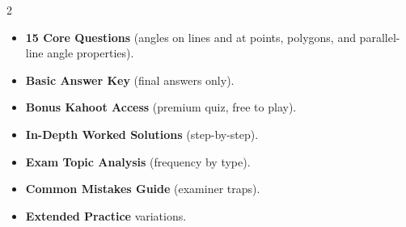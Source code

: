 \documentclass[11pt,a4paper]{article}
\newcommand{\FullReleaseDate}{April 30, 2026}
\begin{document}
\vspace{8pt}

\begin{multicols}{2}
  \begin{tcolorbox}[card, title=\sffamily\bfseries\textcolor{white}{\faHandPointDown\ TODAY (Simplified Version)}, colbacktitle=mainblue, boxed title style={sharp corners, boxrule=0pt}]
    \begin{itemize}[leftmargin=1.2em, itemsep=2pt]
      \item \small \textbf{15 Core Questions} (angles on lines and at points, polygons, and parallel-line angle properties).
      \item \small \textbf{Basic Answer Key} (final answers only).
      \item \small \textbf{Bonus Kahoot Access} (premium quiz, free to play).
    \end{itemize}
  \end{tcolorbox}

  \columnbreak

  \begin{tcolorbox}[card, title=\sffamily\bfseries\textcolor{white}{\faRocket\ ON \FullReleaseDate\ (Full Upgrade)}, colbacktitle=mainblue, boxed title style={sharp corners, boxrule=0pt}]
    \begin{itemize}[leftmargin=1.2em, itemsep=2pt]
      \item \small \textbf{In-Depth Worked Solutions} (step-by-step).
      \item \small \textbf{Exam Topic Analysis} (frequency by type).
      \item \small \textbf{Common Mistakes Guide} (examiner traps).
      \item \small \textbf{Extended Practice} variations.
    \end{itemize}
  \end{tcolorbox}
\end{multicols}
\end{document}
